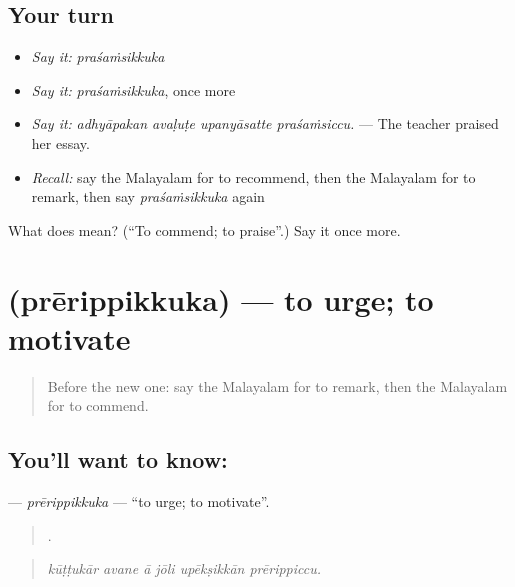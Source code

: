 \subsection*{Your turn}
\begin{itemize}
\raggedright
  \item \emph{Say it:} \emph{praśaṁsikkuka}
  \item \emph{Say it:} \emph{praśaṁsikkuka}, once more
  \item \emph{Say it:} \emph{adhyāpakan avaḷuṭe upanyāsatte praśaṁsiccu.} — The teacher praised her essay.
  \item \emph{Recall:} say the Malayalam for to recommend, then the Malayalam for to remark, then say \emph{praśaṁsikkuka} again
\end{itemize}

\begin{tcolorbox}[breakable,colback=teal!4,colframe=teal!35!black,title={Before you move on}]
What does  mean? (\textquotedblleft{}To commend; to praise\textquotedblright{}.) Say it once more.
\end{tcolorbox}
\section[\texorpdfstring{\ml{പ്രേരിപ്പിക്കുക} (prērippikkuka)}{പ്രേരിപ്പിക്കുക (prērippikkuka)}]{ (prērippikkuka) — to urge; to motivate}

\label{lesson:ML-C413-prerippikkuka}



\begin{quote}
Before the new one: say the Malayalam for to remark, then the Malayalam for to commend.
\end{quote}

\subsection*{You'll want to know: }
\textbf{} — \emph{prērippikkuka} — \textquotedblleft{}to urge; to motivate\textquotedblright{}.

\begin{quote}
     .
\end{quote}

\begin{quote}
\emph{kūṭṭukār avane ā jōli upēkṣikkān prērippiccu.}
\end{quote}

